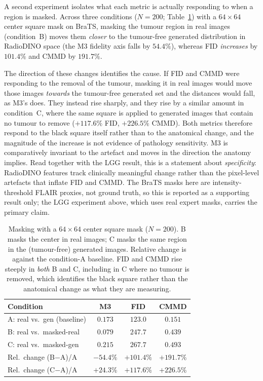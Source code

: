 \documentclass[lettersize,journal]{IEEEtran}
\begin{document}
A second experiment isolates what each metric is actually responding to when a
region is masked. Across three conditions ($N=200$; Table~\ref{tab:masking})
with a $64{\times}64$ center square mask on BraTS, masking the tumour region in
real images (condition~B) moves them \emph{closer} to the tumour-free generated
distribution in RadioDINO space (the M3 fidelity axis falls by $54.4\%$),
whereas FID \emph{increases} by $101.4\%$ and CMMD by $191.7\%$.

The direction of these changes identifies the cause. If FID and CMMD were
responding to the removal of the tumour, masking it in real images would move
those images \emph{towards} the tumour-free generated set and the distances
would fall, as M3's does. They instead rise sharply, and they rise by a similar
amount in condition~C, where the same square is applied to generated images
that contain no tumour to remove ($+117.6\%$ FID, $+226.5\%$ CMMD). Both
metrics therefore respond to the black square itself rather than to the
anatomical change, and the magnitude of the increase is not evidence of
pathology sensitivity. M3 is comparatively invariant to the artefact and moves
in the direction the anatomy implies. Read together with the LGG result, this
is a statement about \emph{specificity}: RadioDINO features track clinically
meaningful change rather than the pixel-level artefacts that inflate FID and
CMMD. The BraTS masks here are intensity-threshold FLAIR proxies, not ground
truth, so this is reported as a supporting result only; the LGG experiment
above, which uses real expert masks, carries the primary claim.

\begin{table}[t]
\centering
\caption{%
  Masking with a $64{\times}64$ center square mask ($N = 200$).
  B masks the center in real images; C masks the same region in the
  (tumour-free) generated images. Relative change is against the condition-A
  baseline. FID and CMMD rise steeply in \emph{both} B and C, including in C
  where no tumour is removed, which identifies the black square rather than the
  anatomical change as what they are measuring.
}
\label{tab:masking}
\begin{tabular}{lccc}
\toprule
Condition & M3 & FID & CMMD \\
\midrule
A: real vs.\ gen (baseline)        & $0.173$ & $123.0$ & $0.151$ \\
B: real vs.\ masked-real           & $0.079$ & $247.7$ & $0.439$ \\
C: real vs.\ masked-gen            & $0.215$ & $267.7$ & $0.493$ \\
\midrule
Rel.\ change (B$-$A)/A             & $\mathbf{-54.4\%}$ & $\mathbf{+101.4\%}$ & $\mathbf{+191.7\%}$ \\
Rel.\ change (C$-$A)/A             & $+24.3\%$ & $+117.6\%$ & $+226.5\%$ \\
\bottomrule
\end{tabular}
\end{table}
\end{document}
